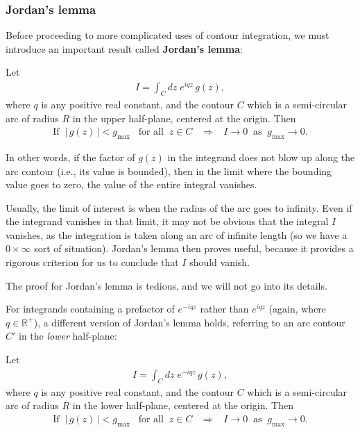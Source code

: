 \documentclass[10pt,a4paper]{article}
\begin{document}
\vskip 0.3in

\subsubsection{Jordan's lemma}
\label{jordans-lemma}

Before proceeding to more complicated uses of contour integration, we
must introduce an important result called \textbf{Jordan's lemma}:

\begin{framed}
\noindent
Let
\begin{align}
  I = \int_C dz \; e^{iqz} \,g(z),
\end{align}
where $q$ is any positive real constant, and the contour $C$ which is a semi-circular arc of radius $R$ in the upper half-plane, centered at the origin. Then
\begin{align}
  \text{If}\;\; \big|\,g(z)\,\big| < g_{\mathrm{max}} \;\;\;\text{for all}\;\;z \in C \;\;\;\Rightarrow \;\;\; I \rightarrow 0 \;\;\mathrm{as}\;\; g_{\mathrm{max}} \rightarrow 0.
\end{align}
\end{framed}

\noindent
In other words, if the factor of $g(z)$ in the integrand does not blow
up along the arc contour (i.e., its value is bounded), then in the
limit where the bounding value goes to zero, the value of the entire
integral vanishes.

Usually, the limit of interest is when the radius of the arc goes to
infinity. Even if the integrand vanishes in that limit, it may not be
obvious that the integral $I$ vanishes, as the integration is taken
along an arc of infinite length (so we have a $0\times\infty$ sort of
situation). Jordan's lemma then proves useful, because it provides a
rigorous criterion for us to conclude that $I$ should vanish.

The proof for Jordan's lemma is tedious, and we will not go into its
details.

 
For integrands containing a prefactor of $e^{-iqz}$ rather than
$e^{iqz}$ (again, where $q \in \mathbb{R}^+$), a different version of
Jordan's lemma holds, referring to an arc contour $C'$ in the
\textit{lower} half-plane:

\begin{framed}
\noindent
Let
\begin{align}
  I = \int_C dz \; e^{-iqz} \,g(z),
\end{align}
where $q$ is any positive real constant, and the contour $C$ which is a semi-circular arc of radius $R$ in the lower half-plane, centered at the origin. Then
\begin{align}
  \text{If}\;\; \big|\,g(z)\,\big| < g_{\mathrm{max}} \;\;\;\text{for all}\;\;z \in C \;\;\;\Rightarrow \;\;\; I \rightarrow 0 \;\;\mathrm{as}\;\; g_{\mathrm{max}} \rightarrow 0.
\end{align}
\end{framed}
\end{document}
